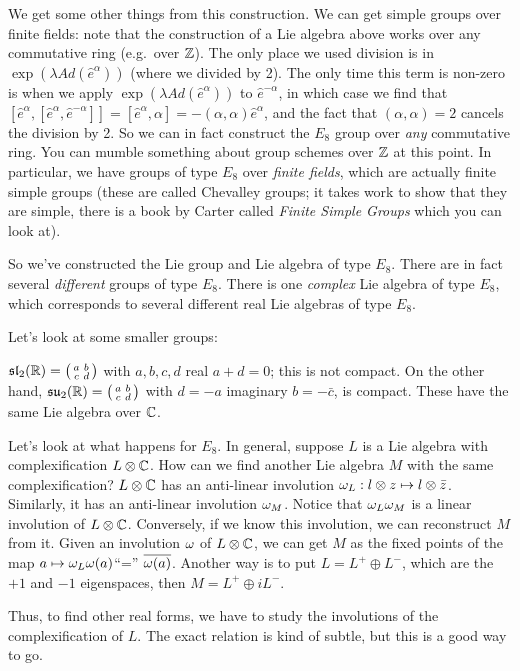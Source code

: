  We get some other things from this construction. We can get simple groups over finite
 fields: note that the construction of a Lie algebra above works over any commutative
 ring (e.g.\ over $\mathbb{Z}$). The only place we used division is in $\exp(\lambda Ad(\hat
 e^\alpha))$ (where we divided by 2). The only time this term is non-zero is when we
 apply $\exp (\lambda Ad(\hat e^\alpha))$ to $\hat e^{-\alpha}$, in which case we find
 that $[\hat e^\alpha,[\hat e^\alpha,\hat e^{-\alpha}]]= [\hat e^\alpha, \alpha] =
 -(\alpha,\alpha) \hat e^\alpha$, and the fact that $(\alpha,\alpha)=2$ cancels the
 division by 2. So we can in fact construct the $E_8$ group over \emph{any} commutative ring.
 You can mumble something about group schemes over $\mathbb{Z}$ at this point. In particular,
 we have groups of type $E_8$ over \emph{finite fields}, which are actually finite
 simple groups (these are called Chevalley groups; it takes work to show that they are
 simple, there is a book by Carter called \textsl{Finite Simple Groups} which you
 can look at).

 So we've constructed the Lie group and Lie algebra of type
 $E_8$. There are in fact several \emph{different} groups of type $E_8$. There is one
 \emph{complex} Lie algebra of type $E_8$, which corresponds to several different real
 Lie algebras of type $E_8$.

 Let's look at some smaller groups:
 \begin{example}
   $\mathfrak{sl}_2(\mathbb{R}) = \left( \begin{smallmatrix} a & b \\ c & d \end{smallmatrix} \right)$ with $a,b,c,d$ real $a+d=0$; this is not compact.
   On the other hand, $\mathfrak{su}_2(\mathbb{R}) = \left( \begin{smallmatrix} a & b \\ c & d \end{smallmatrix} \right)$ with $d=-a$ imaginary $b=-\bar c$, is compact.
   These have the same Lie algebra over $\mathbb{C}$.
 \end{example}

 Let's look at what happens for $E_8$. In general, suppose $L$ is a Lie algebra with
 complexification $L\otimes \mathbb{C}$. How can we find another Lie algebra $M$ with the
 same complexification? $L\otimes \mathbb{C}$ has an anti-linear involution $\omega_L: l\otimes
 z\mapsto l\otimes \bar z$. Similarly, it has an anti-linear involution $\omega_M$. Notice
 that $\omega_L\omega_M$ is a linear involution of $L\otimes \mathbb{C}$. Conversely, if we know this
 involution, we can reconstruct $M$ from it. Given an involution $\omega$ of $L\otimes
 \mathbb{C}$, we can get $M$ as the fixed points of the map $a\mapsto \omega_L \omega(a)$``=''
 $\overline{\omega(a)}$. Another way is to put $L=L^+\oplus L^-$, which are the $+1$ and
 $-1$ eigenspaces, then $M=L^+\oplus iL^-$.

 Thus, to find other real forms, we have to study the involutions of the
 complexification of $L$. The exact relation is kind of subtle, but this is a good way
 to go.

